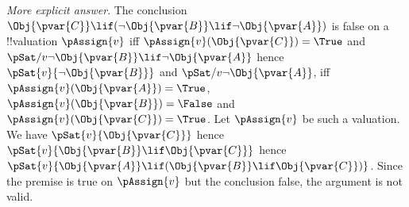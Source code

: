\documentclass[../../../include/open-logic-section]{subfiles}
\begin{document}
\begin{prob}
\begin{ans}
\begin{itemize}
        \emph{More explicit answer}. The conclusion 
        $\Obj{\pvar{C}}\lif(\lnot\Obj{\pvar{B}}\lif\lnot\Obj{\pvar{A}})$
        is false on a !!{valuation} $\pAssign{v}$ iff 
        $\pAssign{v}(\Obj{\pvar{C}})=\True$ and 
        $\pSat/{v}{\lnot\Obj{\pvar{B}}\lif\lnot\Obj{\pvar{A}}}$ 
        hence $\pSat{v}{\lnot\Obj{\pvar{B}}}$ and 
        $\pSat/{v}{\lnot\Obj{\pvar{A}}}$, iff
        $\pAssign{v}(\Obj{\pvar{A}})=\True$, 
        $\pAssign{v}(\Obj{\pvar{B}})=\False$
        and $\pAssign{v}(\Obj{\pvar{C}})=\True$. Let $\pAssign{v}$ 
        be such a valuation. We have $\pSat{v}{\Obj{\pvar{C}}}$
        hence $\pSat{v}{\Obj{\pvar{B}}\lif\Obj{\pvar{C}}}$
        hence $\pSat{v}{\Obj{\pvar{A}}\lif(\Obj{\pvar{B}}\lif\Obj{\pvar{C}})}$.
        Since the premise is true on $\pAssign{v}$ but the conclusion
        false, the argument is not valid.
        
        \end{itemize}
    \end{ans}
\end{prob}
\end{document}
